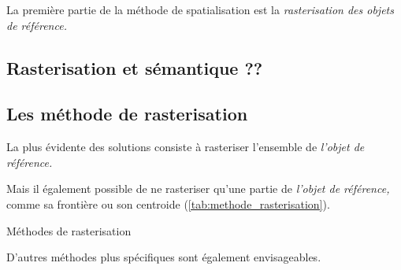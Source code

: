 La première partie de la méthode de spatialisation est la
\emph{rasterisation des objets de référence.}

\subsection{Rasterisation et sémantique ??}


\subsection{Les méthode de rasterisation}



La plus évidente des solutions consiste à rasteriser l'ensemble de
\emph{l'objet de référence.}


Mais il également possible de ne rasteriser qu'une partie de
\emph{l'objet de référence,} comme sa frontière ou son centroide
(\autoref{tab:methode_rasterisation}).

\begin{table}
  \centering
  
  \caption{Méthodes de rasterisation}
  \label{tab:methode_rasterisation}
\end{table}


D'autres méthodes plus spécifiques sont également envisageables.

